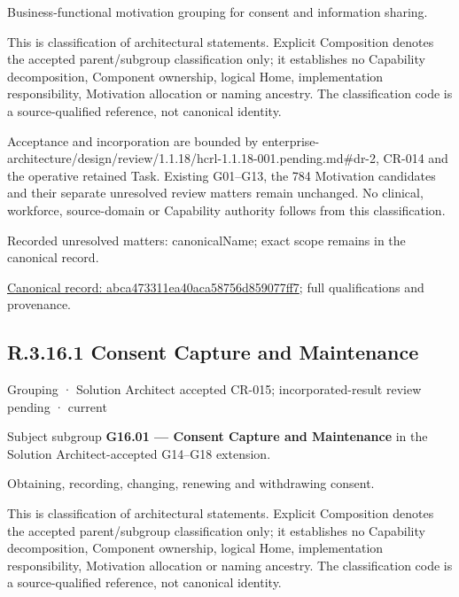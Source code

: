 Business-functional motivation grouping for consent and information sharing.



This is classification of architectural statements. Explicit Composition denotes the accepted parent/subgroup classification only; it establishes no Capability decomposition, Component ownership, logical Home, implementation responsibility, Motivation allocation or naming ancestry. The classification code is a source-qualified reference, not canonical identity.



Acceptance and incorporation are bounded by enterprise-architecture/design/review/1.1.18/hcrl-1.1.18-001.pending.md\#dr-2, CR-014 and the operative retained Task. Existing G01–G13, the 784 Motivation candidates and their separate unresolved review matters remain unchanged. No clinical, workforce, source-domain or Capability authority follows from this classification.


{\small Recorded unresolved matters: canonicalName; exact scope remains in the canonical record.}\par
{\footnotesize \href{../../../../continuum/grouping/abca473311ea40aca58756d859077ff7.md}{Canonical record: abca473311ea40aca58756d859077ff7}; full qualifications and provenance.}\par
\subsection*{R.3.16.1 Consent Capture and Maintenance}
\label{navigation:R.3.16.1}

\label{element:884f06591f6c4dcf8e7f94e4b31269c1}
{\small Grouping · Solution Architect accepted CR-015; incorporated-result review pending · current}\par

Subject subgroup \textbf{G16.01 — Consent Capture and Maintenance} in the Solution Architect-accepted G14–G18 extension.



Obtaining, recording, changing, renewing and withdrawing consent.



This is classification of architectural statements. Explicit Composition denotes the accepted parent/subgroup classification only; it establishes no Capability decomposition, Component ownership, logical Home, implementation responsibility, Motivation allocation or naming ancestry. The classification code is a source-qualified reference, not canonical identity.



